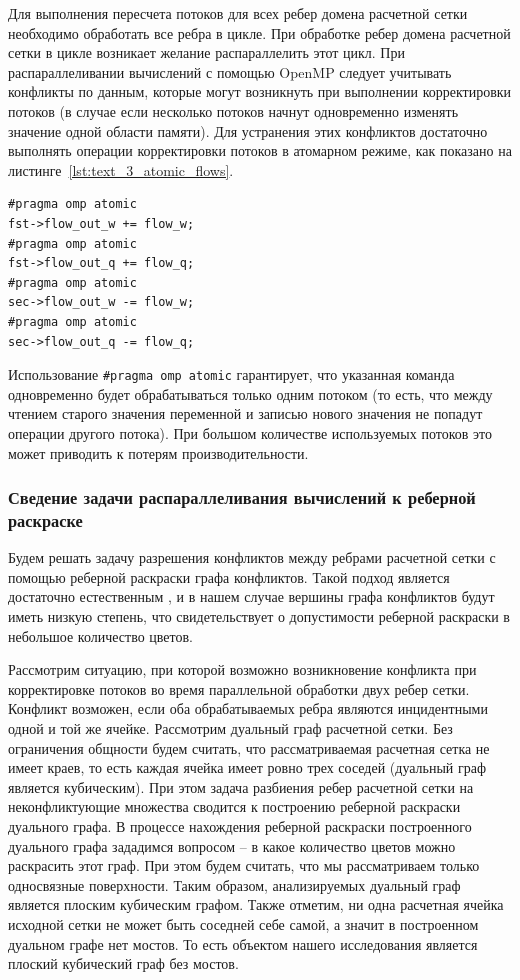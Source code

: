 Для выполнения пересчета потоков для всех ребер домена расчетной сетки необходимо обработать все ребра в цикле.
При обработке ребер домена расчетной сетки в цикле возникает желание распараллелить этот цикл.
При распараллеливании вычислений с помощью OpenMP следует учитывать конфликты по данным, которые могут возникнуть при выполнении корректировки потоков (в случае если несколько потоков начнут одновременно изменять значение одной области памяти).
Для устранения этих конфликтов достаточно выполнять операции корректировки потоков в атомарном режиме, как показано на листинге~\ref{lst:text_3_atomic_flows}.

\begin{lstlisting}[caption={Атомарные операции корректировки потоков.}, label={lst:text_3_atomic_flows}]
#pragma omp atomic
fst->flow_out_w += flow_w;
#pragma omp atomic
fst->flow_out_q += flow_q;
#pragma omp atomic
sec->flow_out_w -= flow_w;
#pragma omp atomic
sec->flow_out_q -= flow_q;
\end{lstlisting}

Использование \texttt{\#pragma omp atomic} гарантирует, что указанная команда одновременно будет обрабатываться только одним потоком (то есть, что между чтением старого значения переменной и записью нового значения не попадут операции другого потока).
При большом количестве используемых потоков это может приводить к потерям производительности.

\subsubsection{Сведение задачи распараллеливания вычислений к реберной раскраске}

Будем решать задачу разрешения конфликтов между ребрами расчетной сетки с помощью реберной раскраски графа конфликтов.
Такой подход является достаточно естественным \cite{Gilfanov2021Coloring}, и в нашем случае вершины графа конфликтов будут иметь низкую степень, что свидетельствует о допустимости реберной раскраски в небольшое количество цветов.

Рассмотрим ситуацию, при которой возможно возникновение конфликта при корректировке потоков во время параллельной обработки двух ребер сетки.
Конфликт возможен, если оба обрабатываемых ребра являются инцидентными одной и той же ячейке.
Рассмотрим дуальный граф расчетной сетки.
Без ограничения общности будем считать, что рассматриваемая расчетная сетка не имеет краев, то есть каждая ячейка имеет ровно трех соседей (дуальный граф является кубическим).
При этом задача разбиения ребер расчетной сетки на неконфликтующие множества сводится к построению реберной раскраски дуального графа.
В процессе нахождения реберной раскраски построенного дуального графа зададимся вопросом -- в какое количество цветов можно раскрасить этот граф.
При этом будем считать, что мы рассматриваем только односвязные поверхности.
Таким образом, анализируемых дуальный граф является плоским кубическим графом.
Также отметим, ни одна расчетная ячейка исходной сетки не может быть соседней себе самой, а значит в построенном дуальном графе нет мостов.
То есть объектом нашего исследования является плоский кубический граф без мостов.

